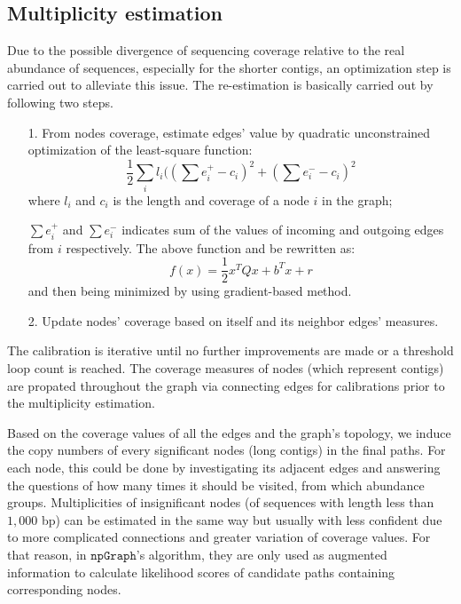 \documentclass[10pt,twocolumn,twoside]{genpaper}
\newcommand{\npgraph}{$\mathtt{npGraph}$}
\begin{document}
\subsection*{Multiplicity estimation}
Due to the possible divergence of sequencing coverage relative to the real abundance of sequences, especially for the shorter contigs, an optimization step is carried out to alleviate this issue.
The re-estimation is basically carried out by following two steps.
\begin{itemize}
\item[1.] From nodes coverage, estimate edges' value by quadratic unconstrained optimization of the least-square function:
$$\frac{1}{2}\sum_{i}{l_i((\sum{e^{+}_{i}}-c_i)^2+(\sum{e^{-}_{i}}-c_i)^2}$$
where $l_i$ and $c_i$ is the length and coverage of a node $i$ in the graph;

$\sum{e^{+}_{i}}$ and $\sum{e^{-}_{i}}$ indicates sum of the values of incoming and outgoing edges from $i$ respectively. 
The above function and be rewritten as:
$$f(x)=\frac{1}{2}x^TQx + b^Tx + r$$
and then being minimized by using gradient-based method.
\item[2.] Update nodes' coverage based on itself and its neighbor edges' measures.
\end{itemize}
The calibration is iterative until no further improvements are made or a threshold loop count is reached.
The coverage measures of nodes (which represent contigs) are propated throughout the graph via connecting edges for calibrations prior to the multiplicity estimation. 

Based on the coverage values of all the edges and the graph's topology, we induce the copy numbers of every significant nodes (long contigs) in the final paths.
For each node, this could be done by investigating its adjacent edges and answering the questions of how many times it should be visited, from which abundance groups.
Multiplicities of insignificant nodes (of sequences with length less than $1,000$ bp) can be estimated in the same way but usually with less confident due to more complicated connections and greater variation of coverage values. 
For that reason, in \npgraph{}'s algorithm, they are only used as augmented information to calculate likelihood scores of candidate paths containing corresponding nodes.

\end{document}
